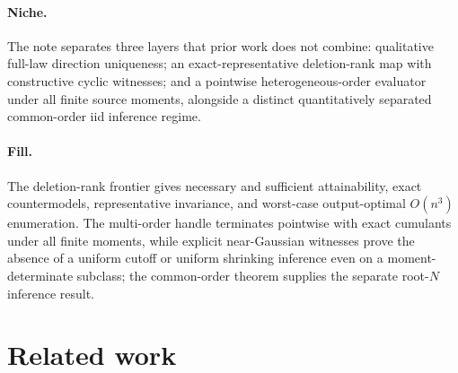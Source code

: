 \documentclass{article}
\begin{document}
\paragraph{Niche.} The note separates three layers that prior work does not combine: qualitative full-law direction uniqueness; an exact-representative deletion-rank map with constructive cyclic witnesses; and a pointwise heterogeneous-order evaluator under all finite source moments, alongside a distinct quantitatively separated common-order iid inference regime.

\paragraph{Fill.} The deletion-rank frontier gives necessary and sufficient attainability, exact countermodels, representative invariance, and worst-case output-optimal \(O(n^3)\) enumeration. The multi-order handle terminates pointwise with exact cumulants under all finite moments, while explicit near-Gaussian witnesses prove the absence of a uniform cutoff or uniform shrinking inference even on a moment-determinate subclass; the common-order theorem supplies the separate root-\(N\) inference result.

\section{Related work}
\end{document}
